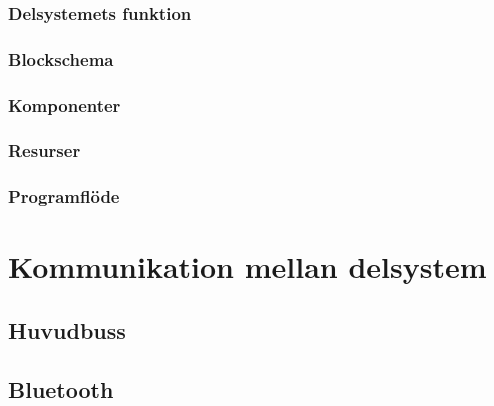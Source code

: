 \documentclass{article}
\begin{document}
\subsubsection{Delsystemets funktion}

\subsubsection{Blockschema}

\subsubsection{Komponenter}

\subsubsection{Resurser}

\subsubsection{Programflöde}

\clearpage

\section{Kommunikation mellan delsystem}

\subsection{Huvudbuss}

\subsection{Bluetooth}
\end{document}
